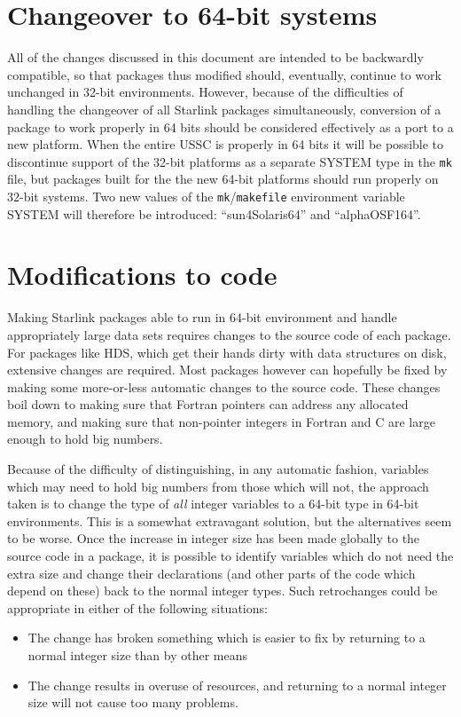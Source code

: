 \documentclass[twoside,11pt]{article}
\newcommand{\xref}[3]{#1}
\renewcommand{\_}{\texttt{\symbol{95}}}
\begin{document}
\section{Changeover to 64-bit systems}

All of the changes discussed in this document
are intended to be backwardly compatible, 
so that packages thus modified should, eventually, 
continue to work unchanged in 32-bit environments.
However, because of the difficulties of handling the changeover of all 
Starlink packages simultaneously, conversion of a package
to work properly in 64 bits should be considered effectively as
a port to a new platform.  
When the entire USSC is properly in 64 bits it will be possible
to discontinue support of the 32-bit platforms as a separate SYSTEM
type in the {\tt mk} file, but packages built for the the new 
64-bit platforms should run properly on 32-bit systems.
Two new values of the {\tt mk}/{\tt makefile} environment variable 
SYSTEM will therefore be introduced: 
``sun4\_Solaris\_64'' and ``alpha\_OSF1\_64''.



\section{Modifications to code\label{sec:modificienda}}

Making Starlink packages able to run in 64-bit environment and 
handle appropriately large data sets requires changes to the source
code of each package.
For packages like \xref{HDS}{sun92}{}, 
which get their hands dirty with data structures on disk,
extensive changes are required.
Most packages however can hopefully be fixed by making some more-or-less
automatic changes to the source code.
These changes boil down to making sure that Fortran pointers 
can address any allocated memory,
and making sure that non-pointer integers in Fortran and C 
are large enough to hold big numbers.

Because of the difficulty of distinguishing, in any automatic fashion,
variables which may 
need to hold big numbers from those which will not,
the approach taken is to change the type of {\em all\/} 
integer variables to a 64-bit type in 64-bit environments.
This is a somewhat extravagant solution,
but the alternatives seem to be worse.
Once the increase in integer size has been made 
globally to the source code in a package,
it is possible to identify variables which do not need the extra size
and change their declarations (and other parts of the code which depend
on these) back to the normal integer types.
Such retrochanges could be appropriate in either of the following situations:
\begin{itemize}
\item
The change has broken something which is easier to fix by returning to 
a normal integer size than by other means
\item
The change results in overuse of resources, and returning to a normal
integer size will not cause too many problems.
\end{itemize}
\end{document}
